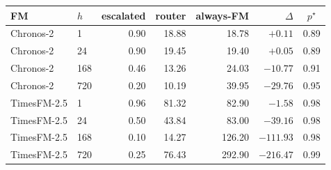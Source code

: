 \begin{tabular}{llrrrrc}
\toprule
FM & $h$ & escalated & router & always-FM & $\Delta$ & $p^{\star}$ \\
\midrule
Chronos-2 & 1 & 0.90 & 18.88 & 18.78 & $+0.11$ & 0.89 \\
Chronos-2 & 24 & 0.90 & 19.45 & 19.40 & $+0.05$ & 0.89 \\
Chronos-2 & 168 & 0.46 & 13.26 & 24.03 & $-10.77$ & 0.91 \\
Chronos-2 & 720 & 0.20 & 10.19 & 39.95 & $-29.76$ & 0.95 \\
TimesFM-2.5 & 1 & 0.96 & 81.32 & 82.90 & $-1.58$ & 0.98 \\
TimesFM-2.5 & 24 & 0.50 & 43.84 & 83.00 & $-39.16$ & 0.98 \\
TimesFM-2.5 & 168 & 0.10 & 14.27 & 126.20 & $-111.93$ & 0.98 \\
TimesFM-2.5 & 720 & 0.25 & 76.43 & 292.90 & $-216.47$ & 0.99 \\
\bottomrule
\end{tabular}
